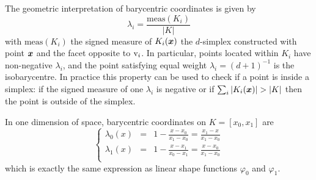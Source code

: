 The geometric interpretation of barycentric coordinates is given by
\[
\displaystyle\lambda_i = \frac{\mathrm{meas}(K_i)}{|K|}
\]
with $\mathrm{meas}(K_i)$ the signed measure of $K_i({{\boldsymbol x}})$ the $d$-simplex constructed with point ${{\boldsymbol x}}$ and the facet opposite to ${\mathrm v}_i$.
In particular, points located within $K_i$ have non-negative $\lambda_i$, and the point satisfying equal weight $\lambda_i = (d+1)^{-1}$ is the isobarycentre.
In practice this property can be used to check if a point is inside a simplex: if the signed measure of one $\lambda_i$ is negative or if $\sum_i |K_i({{\boldsymbol x}})| > |K|$ then the point is outside of the simplex.

\begin{xmpl}
In one dimension of space, barycentric coordinates on $K = [x_0, x_1]$ are
\begin{equation*}
\left\lbrace
\begin{array}{lcl}
\lambda_0(x) &=& 1 - \displaystyle\frac{x - x_0}{x_1 - x_0} = \frac{x_1 - x}{x_1 - x_0}\\[2ex]
\lambda_1(x) &=& 1 - \displaystyle\frac{x - x_1}{x_0 - x_1} = \frac{x - x_0}{x_1 - x_0}\\
\end{array}
\right.
\end{equation*}
which is exactly the same expression as linear shape functions $\varphi_0$ and $\varphi_1$.
\end{xmpl}

